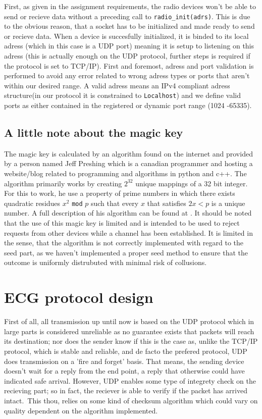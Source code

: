 \documentclass{article}
\newcommand{\code}[1]{\texttt{#1}}
\begin{document}
	First, as given in the assignment requirements, the radio devices won't be able to send or recieve data without a preceding call to \code{radio\_init(adrs)}. This is due to the obvious reason, that a socket has to be initialized and made ready to send or recieve data. When a device is succesfully initialized, it is binded to its local adress (which in this case is a UDP port) meaning it is setup to listening on this adress (this is actually enough on the UDP protocol, further steps is required if the protocol is set to TCP/IP). First and foremost, adress and port validation is performed to avoid any error related to wrong adress types or ports that aren't within our desired range. A valid adress means an IPv4 compliant adress structure(in our protocol it is constrained to \code{Localhost}) and we define valid ports as either contained in the registered or dynamic port range (1024 -65335).
	
	\subsection{A little note about the magic key}
	
	The magic key is calculated by an algorithm found on the internet and provided by a person named Jeff Preshing which is a canadian programmer and hosting a website/blog related to programming and algorithms in python and c++. The algorithm primarily works by creating $2^{32}$ unique mappings of a 32 bit integer. For this to work, he use a property of prime numbers in which there exists quadratic residues $x^2$ \code{mod} $p$ such that every $x$ that satisfies $2x < p$ is a unique number. A full description of his algorithm can be found at \cite{Preshing}. It should be noted that the use of this magic key is limited and is intended to be used to reject requests from other devices while a channel has been established. It is limited in the sense, that the algorithm is not correctly implemented with regard to the seed part, as we haven't implemented a proper seed method to ensure that the outcome is uniformly distrubuted with minimal risk of collusions.
	
	\section{ECG protocol design}
	
	
	First of all, all transmission up until now is based on the UDP protocol which in large parts is considered unreliable as no guarantee exists that packets will reach its destination; nor does the sender know if this is the case as, unlike the TCP/IP protocol, which is stable and reliable, and de facto the prefered protocol, UDP does transmission on a 'fire and forget' basis. That means, the sending device doesn't wait for a reply from the end point, a reply that otherwise could have indicated safe arrival. However, UDP enables some type of integrety check on the recieving part; so in fact, the reciever is able to verify if the packet has arrived intact.\ This thou, relies on some kind of checksum algorithm which could vary on quality dependent on the algorithm implemented.\\
	
\end{document}
